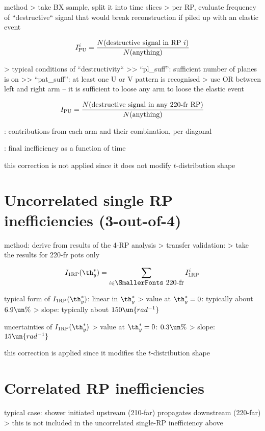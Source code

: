 \> method
\>> take BX sample, split it into time slices
\>> per RP, evaluate frequency of ``destructive`` signal that would break reconstruction if piled up with an elastic event

$$I^{i}_{\rm PU} = {N(\hbox{destructive signal in RP $i$})\over N(\hbox{anything})}$$

\>> typical conditions of ``destructivity``
\>>> ``pl\_suff'': sufficient number of planes is on
\>>> ``pat\_suff'': at least one U or V pattern is recognised 
\>> use OR between left and right arm -- it is sufficient to loose any arm to loose the elastic event

$$I_{\rm PU} = {N(\hbox{destructive signal in any 220-fr RP})\over N(\hbox{anything})}$$


\> : contributions from each arm and their combination, per diagonal

\> : final inefficiency as a function of time

\> this correction is not applied since it does not modify $t$-distribution shape


\section[efficiency-uncorrelated]{Uncorrelated single RP inefficiencies (3-out-of-4)}

\> method: derive from results of the 4-RP analysis
\>> transfer validation: 
\>> take the results for 220-fr pots only

$$I_{\rm 1RP}(\th_y^*) = \sum\limits_{i \in\hbox{\SmallerFonts 220-fr}} I_{\rm 1RP}^i$$

\> typical form of $I_{\rm 1RP}(\th_y^*)$: linear in $\th^*_y$
\>> value at $\th_y^* = 0$: typically about $6.9\un{\%}$
\>> slope: typically about $150\un{rad^{-1}}$

\> uncertainties of $I_{\rm 1RP}(\th_y^*)$
\>> value at $\th_y^* = 0$: $0.3\un{\%}$
\>> slope: $15\un{rad^{-1}}$

\> this correction is applied since it modifies the $t$-distribution shape


\section[efficiency-correlated]{Correlated RP inefficiencies}

\> typical case: shower initiated upstream (210-far) propagates downstream (220-far)
\>> this is not included in the uncorrelated single-RP inefficiency above

